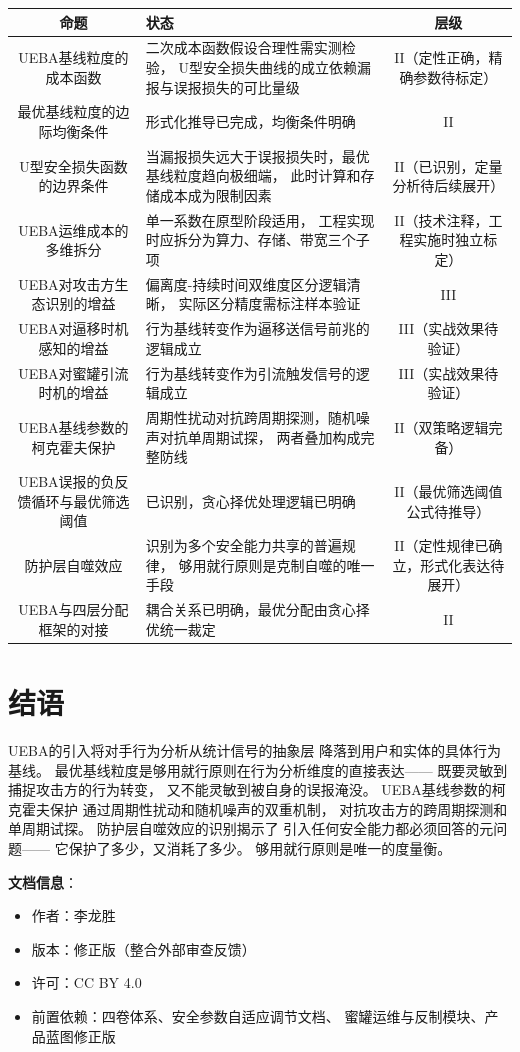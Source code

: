 \documentclass[11pt,a4paper]{article}
\begin{document}
\begin{center}
\begin{xltabular}{\textwidth}{c|X|c}
\toprule
\textbf{命题} & \textbf{状态} & \textbf{层级} \\
\midrule
UEBA基线粒度的成本函数 &
二次成本函数假设合理性需实测检验，
U型安全损失曲线的成立依赖漏报与误报损失的可比量级 &
II（定性正确，精确参数待标定） \\
最优基线粒度的边际均衡条件 &
形式化推导已完成，均衡条件明确 &
II \\
U型安全损失函数的边界条件 &
当漏报损失远大于误报损失时，最优基线粒度趋向极细端，
此时计算和存储成本成为限制因素 &
II（已识别，定量分析待后续展开） \\
UEBA运维成本的多维拆分 &
单一系数在原型阶段适用，
工程实现时应拆分为算力、存储、带宽三个子项 &
II（技术注释，工程实施时独立标定） \\
UEBA对攻击方生态识别的增益 &
偏离度-持续时间双维度区分逻辑清晰，
实际区分精度需标注样本验证 &
III \\
UEBA对逼移时机感知的增益 &
行为基线转变作为逼移送信号前兆的逻辑成立 &
III（实战效果待验证） \\
UEBA对蜜罐引流时机的增益 &
行为基线转变作为引流触发信号的逻辑成立 &
III（实战效果待验证） \\
UEBA基线参数的柯克霍夫保护 &
周期性扰动对抗跨周期探测，随机噪声对抗单周期试探，
两者叠加构成完整防线 &
II（双策略逻辑完备） \\
UEBA误报的负反馈循环与最优筛选阈值 &
已识别，贪心择优处理逻辑已明确 &
II（最优筛选阈值公式待推导） \\
防护层自噬效应 &
识别为多个安全能力共享的普遍规律，
够用就行原则是克制自噬的唯一手段 &
II（定性规律已确立，形式化表达待展开） \\
UEBA与四层分配框架的对接 &
耦合关系已明确，最优分配由贪心择优统一裁定 &
II \\
\bottomrule
\end{xltabular}
\end{center}

\section{结语}

UEBA的引入将对手行为分析从统计信号的抽象层
降落到用户和实体的具体行为基线。
最优基线粒度是够用就行原则在行为分析维度的直接表达——
既要灵敏到捕捉攻击方的行为转变，
又不能灵敏到被自身的误报淹没。
UEBA基线参数的柯克霍夫保护
通过周期性扰动和随机噪声的双重机制，
对抗攻击方的跨周期探测和单周期试探。
防护层自噬效应的识别揭示了
引入任何安全能力都必须回答的元问题——
它保护了多少，又消耗了多少。
够用就行原则是唯一的度量衡。

\vspace{5mm}
\noindent\textbf{文档信息}：
\begin{itemize}
    \item 作者：李龙胜
    \item 版本：修正版（整合外部审查反馈）
    \item 许可：CC BY 4.0
    \item 前置依赖：四卷体系、安全参数自适应调节文档、
          蜜罐运维与反制模块、产品蓝图修正版
\end{itemize}
\end{document}
